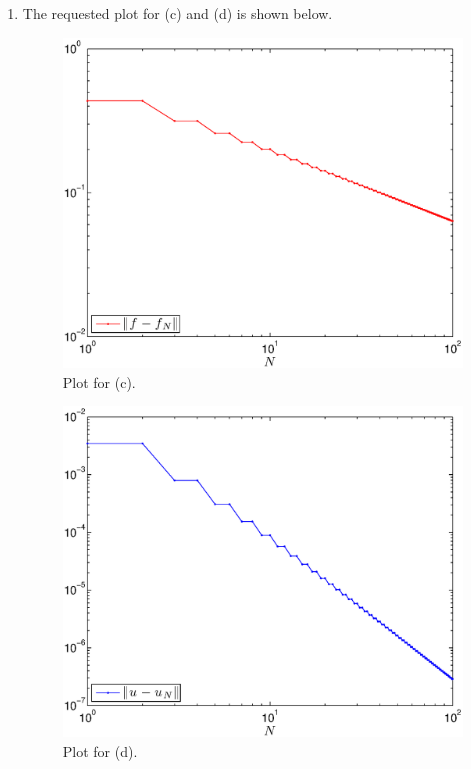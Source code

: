 \begin{solution}
\begin{enumerate}
%
%


\item The requested plot for (c) and (d) is shown below. 

\begin{figure}
\centering
\includegraphics[scale=0.7]{fourerr1.eps}
\caption{Plot for (c).}
\end{figure}

\begin{figure}
\centering
\includegraphics[scale=0.7]{fourerr2.eps}
\caption{Plot for (d).}
\end{figure}


\end{enumerate}
\end{solution}
